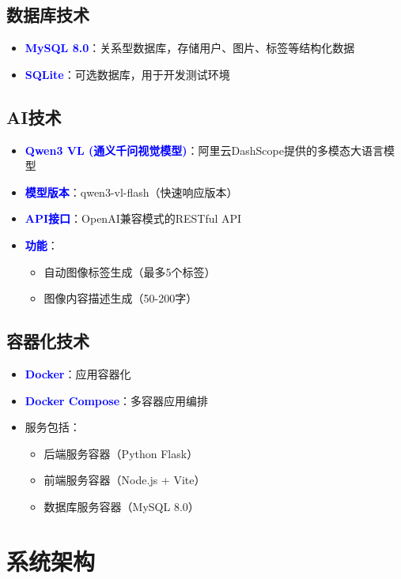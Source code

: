 \documentclass[12pt,a4paper]{article}
\newcommand{\tech}[1]{\textbf{\textcolor{blue}{#1}}}
\begin{document}
\subsection{数据库技术}

\begin{itemize}
    \item \tech{MySQL 8.0}：关系型数据库，存储用户、图片、标签等结构化数据
    \item \tech{SQLite}：可选数据库，用于开发测试环境
\end{itemize}

\subsection{AI技术}

\begin{itemize}
    \item \tech{Qwen3 VL (通义千问视觉模型)}：阿里云DashScope提供的多模态大语言模型
    \item \tech{模型版本}：qwen3-vl-flash（快速响应版本）
    \item \tech{API接口}：OpenAI兼容模式的RESTful API
    \item \tech{功能}：
    \begin{itemize}
        \item 自动图像标签生成（最多5个标签）
        \item 图像内容描述生成（50-200字）
    \end{itemize}
\end{itemize}

\subsection{容器化技术}

\begin{itemize}
    \item \tech{Docker}：应用容器化
    \item \tech{Docker Compose}：多容器应用编排
    \item 服务包括：
    \begin{itemize}
        \item 后端服务容器（Python Flask）
        \item 前端服务容器（Node.js + Vite）
        \item 数据库服务容器（MySQL 8.0）
    \end{itemize}
\end{itemize}

\section{系统架构}
\end{document}
